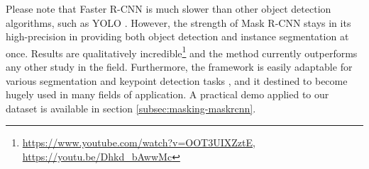 Please note that Faster R-CNN is much slower \cite{medium_rcnn} than other object detection algorithms, such as YOLO \cite{redmon2016look}. However, the strength of Mask R-CNN stays in its high-precision in providing both object detection and instance segmentation at once. Results are qualitatively incredible\footnote{\url{https://www.youtube.com/watch?v=OOT3UIXZztE}, \url{https://youtu.be/Dhkd_bAwwMc}} and the method currently outperforms any other study in the field. Furthermore, the framework is easily adaptable for various segmentation and keypoint detection tasks \cite{he2018mask} \cite{MaskRCNN_matterport} \cite{maskrcnn_explanation}, and it destined to become hugely used in many fields of application. A practical demo applied to our dataset is available in section \ref{subsec:masking-maskrcnn}.






